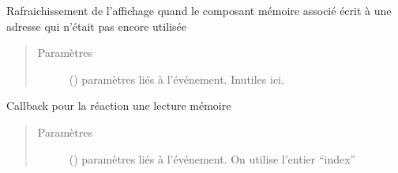 \documentclass[letterpaper,10pt,french]{sphinxmanual}
\begin{document}
\begin{fulllineitems}
\begin{fulllineitems}
\label{\detokenize{widgets:widgets.MemoryWidget.onfill}}
Rafraichissement de l’affichage quand le composant mémoire
associé écrit à une adresse qui n’était pas encore utilisée
\begin{quote}\begin{description}
\item[{Paramètres}] \leavevmode
{} () \textendash{} paramètres liés à l’événement. Inutiles ici.

\end{description}\end{quote}

\end{fulllineitems}


\begin{fulllineitems}
\label{\detokenize{widgets:widgets.MemoryWidget.onread}}
Callback pour la réaction une lecture mémoire
\begin{quote}\begin{description}
\item[{Paramètres}] \leavevmode
{} (\sphinxstyleliteralemphasis{\sphinxupquote{{[}}}\sphinxstyleliteralemphasis{\sphinxupquote{, }}\sphinxstyleliteralemphasis{\sphinxupquote{{]}}}) \textendash{} paramètres liés à l’événement. On utilise l’entier “index”

\end{description}\end{quote}

\end{fulllineitems}



\end{fulllineitems}
\end{document}
